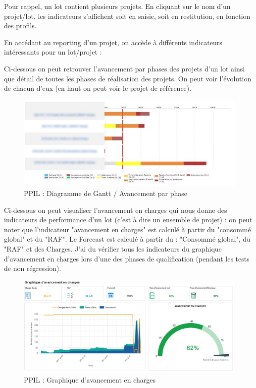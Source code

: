 Pour rappel, un lot contient plusieurs projets. En cliquant sur le nom d’un projet/lot, les indicateurs s'affichent soit en saisie, soit en restitution, en fonction des profils. 

En accédant au reporting d'un projet, on accède à différents indicateurs intéressants pour un lot/projet : 

Ci-dessous on peut retrouver l'avancement par phases des projets d'un lot ainsi que détail de toutes les phases de réalisation des projets. On peut voir l'évolution de chacun d'eux (en haut on peut voir le projet de référence).

\begin{figure}[h]
\centering
\includegraphics[width=1\textwidth]{images/PPIL-Gantt-censored.png}
\caption{PPIL : Diagramme de Gantt / Avancement par phase}
\end{figure}

Ci-dessous on peut visualiser l'avancement en charges qui nous donne des indicateurs de performance d'un lot (c'est à dire un ensemble de projet) : on peut noter que l'indicateur "avancement en charges" est calculé à partir du "consommé global" et du "RAF". Le Forecast est calculé à partir du : "Consommé global", du "RAF" et des Charges. J'ai du vérifier tous les indicateurs du graphique d'avancement en charges lors d'une des phases de qualification (pendant les tests de non régression).
\begin{figure}[h]
\centering
\includegraphics[width=1\textwidth]{images/PPIL-avancement.png}
\caption{PPIL : Graphique d'avancement en charges}
\end{figure}

